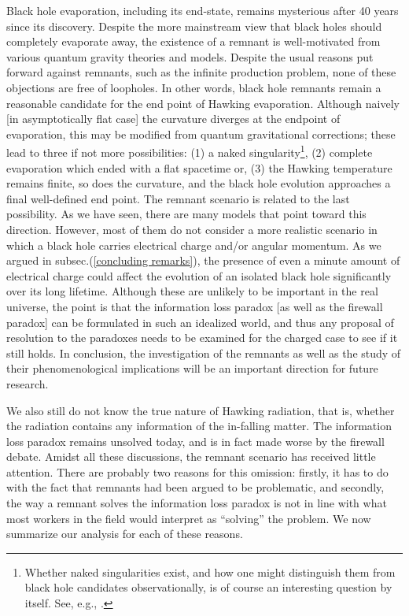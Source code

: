 \documentclass[12pt]{article}
\newcommand{\2}{$^2$}
\newcommand{\3}{$^3$}
\newcommand{\4}{$_4$}
\newcommand{\5}{$_5$}
\begin{document}
Black hole evaporation, including its end-state, remains mysterious after 40 years since its discovery. Despite the more mainstream view that black holes should completely evaporate away, the existence of a remnant is well-motivated from various quantum gravity theories and models. Despite the usual reasons put forward against remnants, such as the infinite production problem, none of these objections are free of loopholes. In other words, black hole remnants remain a 
reasonable candidate for the end point of Hawking evaporation. Although naively [in asymptotically flat case] the curvature diverges at the endpoint of evaporation, this may be modified from quantum gravitational corrections; these lead to three if not more possibilities: (1) a naked singularity\footnote{{\color{black}Whether naked singularities exist, and how one might distinguish them from black hole candidates observationally, is of course an interesting question by itself. See, e.g., \cite{0710.2333, 1206.3077}.}}, (2) complete evaporation which ended with a flat spacetime or, (3) the Hawking temperature remains finite, so does the curvature, and the black hole evolution approaches a final well-defined end point. The remnant scenario is related to the last possibility. As we have seen, there are many models that point toward this direction. However, most of them do not consider a more realistic scenario in which a black hole carries electrical charge and/or angular momentum. As we argued in subsec.(\ref{concluding remarks}), the presence of even a minute amount of electrical charge could affect the evolution of an isolated black hole significantly over its long lifetime. Although these are unlikely to be important in the real universe, the point is that the information loss paradox [as well as the firewall paradox] can be formulated in such an idealized world, and thus any proposal of resolution to the paradoxes needs to be examined for the charged case to see if it still holds.  
In conclusion, the investigation of the remnants as well as the study of their phenomenological implications will be an important direction for future research.

We also still do not know the true nature of Hawking radiation, that is, whether the radiation contains any information of the in-falling matter. The information loss paradox remains unsolved today, and is in fact made worse by the firewall debate. Amidst all these discussions, the remnant scenario has received little attention. There are probably two reasons for this omission: firstly, it has to do with the fact that remnants had been argued to be problematic, and secondly, the way a remnant solves the information loss paradox is not in line with what most workers in the field would interpret as ``solving'' the problem. We now summarize our analysis for each of these reasons.
\end{document}
